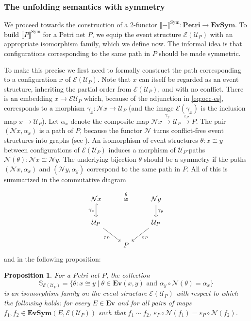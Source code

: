 \documentclass[11pt,a4paper]{article}
\theoremstyle{plain}
\newtheorem{proposition}[theorem]{Proposition}
\theoremstyle{definition}
\theoremstyle{remark}
\newcommand{\calN}{\mathcal{N}}
\newcommand{\calE}{\mathcal{E}}
\newcommand{\calU}{\mathcal{U}}
\newcommand{\Petri}{\mathbf{Petri}}
\newcommand{\ES}{\mathbf{Ev}}
\newcommand{\SES}{\mathbf{EvSym}}
\newcommand{\semSA}[1]{\llbracket #1 \rrbracket^{\mathrm{Sym}}}
\begin{document}
\subsubsection{The unfolding semantics with symmetry}

\newcommand{\semAlone}{\semSA{-}}
We proceed towards the construction of a 2-functor $\semAlone : \Petri \to \SES$. To build $\semSA{P}$ for a Petri net $P$, we equip the event structure $\calE(\calU_P)$ with an appropriate isomorphism family, which we define now.  The informal idea is that configurations corresponding to the same path in $P$ should be made symmetric. 

To make this precise we first need to formally construct the path corresponding to a configuration $x$ of $\calE(\calU_{P})$. Note that $x$ can itself be regarded as an event structure, inheriting the partial order from $\calE(\calU_{P})$, and with no conflict. There is an embedding $x \to \calE\calU_{P}$ which, because of the adjunction in \eqref{eq:occ-es}, corresponds to a morphism $\gamma_x : \calN x \rightarrow \calU_{P}$ (and the image $\calE(\gamma_x)$ is the inclusion map $x \to \calU_{P}$). Let $\alpha_x$ denote the composite map $\calN x \xrightarrow {\gamma_x} \calU_{P} \xrightarrow{\varepsilon_P} P$. The pair $(\calN x, \alpha_x)$ is a path  
of $P$, because the functor $\calN$ turns conflict-free event structures into graphs (see \cite{ES1}). An isomorphism of event structures $\theta : x \cong y$ between configurations of $\calE(\calU_P)$ induces a morphism of $\calU_P$-paths $\calN(\theta) : \calN x \cong \calN y$. The underlying bijection $\theta$ should be a symmetry if the paths $(\calN x, \alpha_x)$ and $(\calN y, \alpha_y)$ correspond to the same path in $P$. All of this is summarized in the commutative diagram 

\[\begin{tikzcd}
	{\calN x} && {\calN y} \\
	{\calU_P} && {\calU_P} \\
	& P
	\arrow["\cong"{description}, draw=none, from=1-1, to=1-3]
	\arrow["\theta"{description}, shift left=3, draw=none, from=1-1, to=1-3]
	\arrow["{{\gamma_x}}"', hook, from=1-1, to=2-1]
	\arrow["{{\gamma_y}}", from=1-3, to=2-3]
	\arrow["{{\varepsilon_P}}"', from=2-1, to=3-2]
	\arrow["{{\varepsilon_P}}", from=2-3, to=3-2]
\end{tikzcd}\]
and in the following proposition:
\begin{proposition} 
\label{prop:sem-symmetry}
For a Petri net $P$, the collection
\[
\mathbb{S}_{\calE(\calU_P)} = \{\theta : x \cong y \mid \theta \in \ES(x, y) \text{\ and\ } \alpha_y \circ \calN(\theta) = \alpha_x\} \] is an isomorphism family on the event structure $\calE(\calU_{P})$ with respect to which the following holds: for every $E \in \ES$ and for all pairs of maps $f_1, f_2 \in \SES(E, \calE(\calU_P))$  such that $f_1 \sim f_2$, $\varepsilon_P \circ \calN(f_1) =\varepsilon_P \circ \calN(f_2)$.
\end{proposition}
\end{document}

